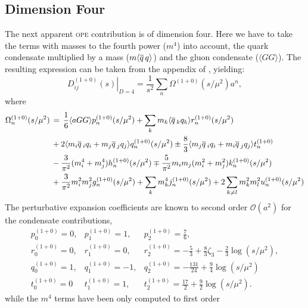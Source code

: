 \documentclass[../../index.tex]{subfiles}
\begin{document}
\subsection{Dimension Four}
The next apparent \textsc{ope} contribution is of dimension four. Here we have
to take the terms with masses to the fourth power (\(m^4\)) into account, the
quark condensate multiplied by a mass (\(m \langle \overline{q}\, q \rangle\)) and the
gluon condensate (\(\langle GG \rangle\)). The resulting expression can be taken
from the appendix of \cite{Pich1999}, yielding:
\begin{equation}
  \left. D_{ij}^{(1+0)}(s) \right\rvert_{D=4} = \frac{1}{s^2} \sum_n \Omega^{(1+0)}(s/\mu^2)a^n,
\end{equation}
where
\begin{equation}
  \begin{split}
    \Omega_n^{(1+0)} (s/\mu^2) &\,=\, \frac{1}{6}\langle aGG \rangle p_n^{(1+0)}(s/\mu^2) + \sum_k m_k \langle \overline{q}\,_k q_k \rangle r_n^{(1+0)}(s/\mu^2) \\
    &\,+ 2\langle m_i \overline{q}\,_i q_i + m_j \overline{q}\,_j q_j \rangle q_n^{(1+0)} (s/\mu^2) \pm \frac{8}{3} \langle m_j \overline{q}\,_i q_i + m_i \overline{q}\,_j q_j \rangle t_n^{(1+0)} \\
    &\,- \frac{3}{\pi^2} (m_i^4 + m_j^4) h_n^{(1+0)} (s/\mu^2) \mp \frac{5}{\pi^2} m_i m_j (m_i^2 + m_j^2) k_n^{(1+0)}(s/\mu^2)\\
    &\,+ \frac{3}{\pi^2} m_i^2 m_j^2 g_n^{(1+0)}(s/\mu^2) + \sum_k m_k^4
    j_n^{(1+0)}(s/\mu^2) + 2 \sum_{k \neq l} m_k^2 m_l^2 u_n^{(1+0)}(s/\mu^2)
  \end{split}
\end{equation}
The perturbative expansion coefficients are known to second order
\(\mathcal{O}(a^2)\) for the condensate contributions,
\begin{equation}
  \begin{array}{lll}
    p_0^{(1+0)}=0, & p_1^{(1+0)}=1, & p_2^{(1+0)}=\frac{7}{6}, \\
    r_0^{(1+0)}=0, & r_1^{(1+0)}=0, & r_2^{(1+0)}=-\frac{5}{3}+\frac{8}{3}\zeta_3-\frac{2}{3}\log(s/\mu^2), \\
    q_0^{(1+0)}=1, & q_1^{(1+0)}=-1, & q_2^{(1+0)}=-\frac{131}{24}+\frac{9}{4}\log(s/\mu^2) \\
    t_0^{(1+0)}=0 & t_1^{(1+0)}=1, & t_2^{(1+0)}=\frac{17}{2}+\frac{9}{2}\log(s/\mu^2).
  \end{array}
\end{equation}
while the \(m^4\) terms have been only computed to first order
\end{document}
